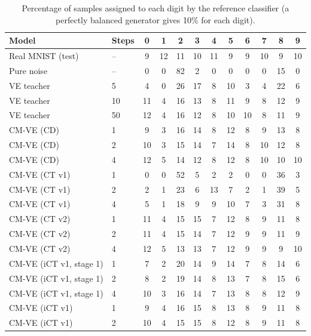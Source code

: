 \documentclass{article}
\begin{document}
\begin{table}[H]
  \caption{Percentage of samples assigned to each digit by the reference
  classifier (a perfectly balanced generator gives 10\% for each digit).}
  \label{tab:digits}
  \centering
  \footnotesize
  \setlength{\tabcolsep}{4pt}
  \begin{tabular}{llcccccccccc}
    \toprule
    Model & Steps & 0 & 1 & 2 & 3 & 4 & 5 & 6 & 7 & 8 & 9 \\
    \midrule
    Real MNIST (test) & -- & 9 & 12 & 11 & 10 & 11 & 9 & 9 & 10 & 9 & 10 \\
    Pure noise & -- & 0 & 0 & 82 & 2 & 0 & 0 & 0 & 0 & 15 & 0 \\
    \midrule
    VE teacher & 5 & 4 & 0 & 26 & 17 & 8 & 10 & 3 & 4 & 22 & 6 \\
    VE teacher & 10 & 11 & 4 & 16 & 13 & 8 & 11 & 9 & 8 & 12 & 9 \\
    VE teacher & 50 & 12 & 4 & 16 & 12 & 8 & 10 & 10 & 8 & 11 & 9 \\
    \midrule
    CM-VE (CD) & 1 & 9 & 3 & 16 & 14 & 8 & 12 & 8 & 9 & 13 & 8 \\
    CM-VE (CD) & 2 & 10 & 3 & 15 & 14 & 7 & 14 & 8 & 10 & 12 & 8 \\
    CM-VE (CD) & 4 & 12 & 5 & 14 & 12 & 8 & 12 & 8 & 10 & 10 & 10 \\
    \midrule
    CM-VE (CT v1) & 1 & 0 & 0 & 52 & 5 & 2 & 2 & 0 & 0 & 36 & 3 \\
    CM-VE (CT v1) & 2 & 2 & 1 & 23 & 6 & 13 & 7 & 2 & 1 & 39 & 5 \\
    CM-VE (CT v1) & 4 & 5 & 1 & 18 & 9 & 9 & 10 & 7 & 3 & 31 & 8 \\
    \midrule
    CM-VE (CT v2) & 1 & 11 & 4 & 15 & 15 & 7 & 12 & 8 & 9 & 11 & 8 \\
    CM-VE (CT v2) & 2 & 11 & 4 & 15 & 14 & 7 & 12 & 9 & 9 & 11 & 9 \\
    CM-VE (CT v2) & 4 & 12 & 5 & 13 & 13 & 7 & 12 & 9 & 9 & 9 & 10 \\
    \midrule
    CM-VE (iCT v1, stage 1) & 1 & 7 & 2 & 20 & 14 & 9 & 14 & 7 & 8 & 14 & 6 \\
    CM-VE (iCT v1, stage 1) & 2 & 8 & 2 & 19 & 14 & 8 & 13 & 7 & 8 & 15 & 6 \\
    CM-VE (iCT v1, stage 1) & 4 & 10 & 3 & 16 & 14 & 7 & 13 & 8 & 8 & 12 & 9 \\
    \midrule
    CM-VE (iCT v1) & 1 & 9 & 4 & 16 & 15 & 8 & 13 & 8 & 9 & 11 & 8 \\
    CM-VE (iCT v1) & 2 & 10 & 4 & 15 & 15 & 8 & 12 & 8 & 9 & 11 & 8 \\

\end{tabular}
\end{table}
\end{document}
